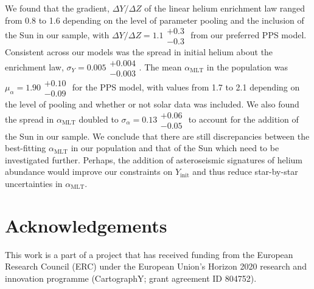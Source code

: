 \documentclass[a4paper,fleqn,usenatbib]{mnras}
\newcommand{\mlt}{\ensuremath{{\alpha_\mathrm{MLT}}}}
\begin{document}
We found that the gradient, $\Delta Y / \Delta Z$ of the linear helium enrichment law ranged from 0.8 to 1.6 depending on the level of parameter pooling and the inclusion of the Sun in our sample, with $\Delta Y / \Delta Z = 1.1\substack{+0.3\\-0.3}$ from our preferred PPS model. Consistent across our models was the spread in initial helium about the enrichment law, $\sigma_Y = 0.005\substack{+0.004\\-0.003}$. The mean $\mlt$ in the population was $\mu_\alpha = 1.90\substack{+0.10\\-0.09}$ for the PPS model, with values from 1.7 to 2.1 depending on the level of pooling and whether or not solar data was included. We also found the spread in $\mlt$ doubled to $\sigma_\alpha = 0.13\substack{+0.06\\-0.05}$ to account for the addition of the Sun in our sample. We conclude that there are still discrepancies between the best-fitting $\mlt$ in our population and that of the Sun which need to be investigated further. Perhaps, the addition of asteroseismic signatures of helium abundance \citep[see e.g.][]{Verma.Raodeo.ea2017} would improve our constraints on $Y_\mathrm{init}$ and thus reduce star-by-star uncertainties in $\mlt$.

\section*{Acknowledgements}

This work is a part of a project that has received funding from the European Research Council (ERC) under the European Union’s Horizon 2020 research and innovation programme (CartographY; grant agreement ID 804752).








\appendix

\end{document}
